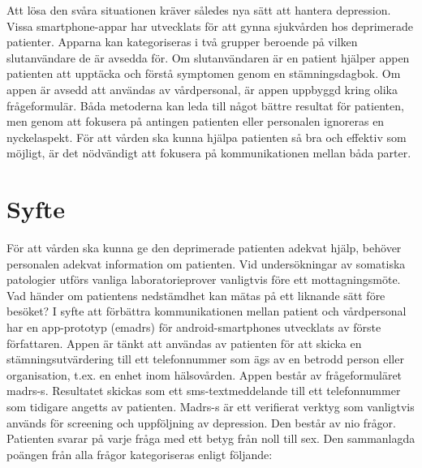 \documentclass[12pt,a4paper,oneside]{article}
\let\oldcite\cite
\renewcommand*\cite[1]{\textsuperscript{\oldcite{#1}}}
\begin{document}
Att l{\"o}sa den sv{\aa}ra situationen kr{\"a}ver s{\aa}ledes nya s{\"a}tt att hantera depression. Vissa smartphone-appar har utvecklats f{\"o}r att gynna sjukv{\aa}rden hos deprimerade patienter. Apparna kan kategoriseras i tv{\aa} grupper beroende p{\aa} vilken slutanv{\"a}ndare de {\"a}r avsedda f{\"o}r. Om slutanv{\"a}ndaren {\"a}r en patient hj{\"a}lper appen patienten att uppt{\"a}cka och f{\"o}rst{\aa} symptomen genom en st{\"a}mningsdagbok\cite {app1}. Om appen {\"a}r avsedd att anv{\"a}ndas av v{\aa}rdpersonal, {\"a}r appen uppbyggd kring olika fr{\aa}geformul{\"a}r\cite {app2}. B{\aa}da metoderna kan leda till n{\aa}got b{\"a}ttre resultat f{\"o}r patienten, men genom att fokusera p{\aa} antingen patienten eller personalen ignoreras en nyckelaspekt. F{\"o}r att v{\aa}rden ska kunna hj{\"a}lpa patienten s{\aa} bra och effektiv som m{\"o}jligt, {\"a}r det n{\"o}dv{\"a}ndigt att fokusera p{\aa} kommunikationen mellan b{\aa}da parter.

\section*{Syfte}
F{\"o}r att v{\aa}rden ska kunna ge den deprimerade patienten adekvat hj{\"a}lp, beh{\"o}ver personalen adekvat information om patienten. Vid unders{\"o}kningar av somatiska patologier utf{\"o}rs vanliga laboratorieprover vanligtvis f{\"o}re ett mottagningsm{\"o}te. Vad h{\"a}nder om patientens nedst{\"a}mdhet kan m{\"a}tas p{\aa} ett liknande s{\"a}tt f{\"o}re bes{\"o}ket? I syfte att f{\"o}rb{\"a}ttra kommunikationen mellan patient och v{\aa}rdpersonal har en app-prototyp (e{\sc madrs}) f{\"o}r android-smartphones utvecklats av f{\"o}rste f{\"o}rfattaren\cite {emadrs1, emadrs2}. Appen {\"a}r t{\"a}nkt att anv{\"a}ndas av patienten f{\"o}r att skicka en st{\"a}mningsutv{\"a}rdering till ett telefonnummer som {\"a}gs av en betrodd person eller organisation, t.ex. en enhet inom h{\"a}lsov{\aa}rden. Appen best{\aa}r av fr{\aa}geformul{\"a}ret {\sc madrs-s}. Resultatet skickas som ett {\sc sms}-textmeddelande till ett telefonnummer som tidigare angetts av patienten. {\sc Madrs-s} {\"a}r ett verifierat verktyg som vanligtvis anv{\"a}nds f{\"o}r screening och uppf{\"o}ljning av depression\cite {madrs2, madrs3}. Den best{\aa}r av nio fr{\aa}gor. Patienten svarar p{\aa} varje fr{\aa}ga med ett betyg fr{\aa}n noll till sex. Den sammanlagda po{\"a}ngen fr{\aa}n alla fr{\aa}gor kategoriseras enligt f{\"o}ljande: \\
\end{document}
